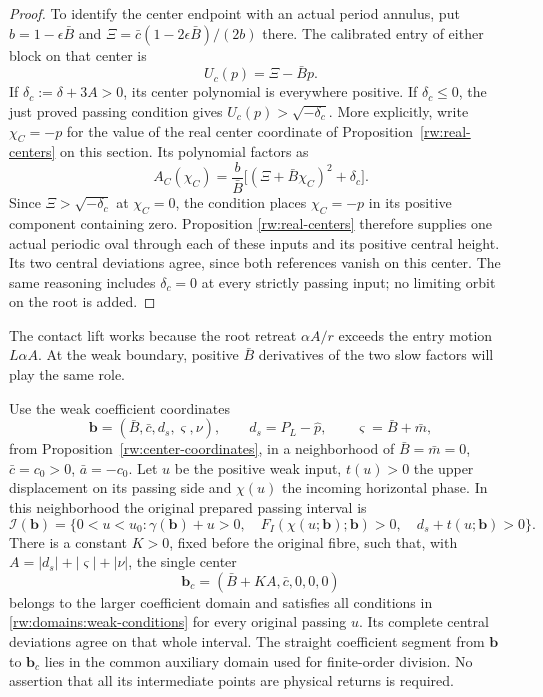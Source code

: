 \begin{proof}
To identify the center endpoint with an actual period annulus, put
$b=1-\epsilon\bar B$ and
$\Xi=\bar c(1-2\epsilon\bar B)/(2b)$ there. The calibrated
entry of either block on that center is
\[
 U_c(p)=\Xi-\bar Bp.
\]
If $\delta_c:=\delta+3A>0$, its center polynomial is everywhere
positive. If $\delta_c\le0$, the just proved passing condition
gives $U_c(p)>\sqrt{-\delta_c}$. More explicitly, write
$\chi_C=-p$ for the value of the real center coordinate of
Proposition~\ref{rw:real-centers} on this section. Its polynomial
factors as
\[
 A_C(\chi_C)=\frac b{\bar B}
              \bigl[(\Xi+\bar B\chi_C)^2+\delta_c\bigr].
\]
Since $\Xi>\sqrt{-\delta_c}$ at $\chi_C=0$, the condition places
$\chi_C=-p$ in its positive component containing zero. Proposition
\ref{rw:real-centers} therefore supplies one actual periodic oval
through each of these inputs and its positive central height.
Its two central deviations agree, since both references vanish on
this center. The same reasoning includes $\delta_c=0$ at every
strictly passing input; no limiting orbit on the root is added.
\end{proof}

The contact lift works because the root retreat $\alpha A/r$ exceeds
the entry motion $L\alpha A$. At the weak boundary, positive
$\bar B$ derivatives of the two slow factors will play the same role.

\begin{proposition}
\label{rw:domains:weak}
Use the weak coefficient coordinates
\[
 \mathbf b=(\bar B,\bar c,d_s,\varsigma,\nu),\qquad
 d_s=P_L-\widehat p,\qquad\varsigma=\bar B+\bar m,
\]
from Proposition~\ref{rw:center-coordinates}, in a neighborhood of
$\bar B=\bar m=0$, $\bar c=c_0>0$, $\bar a=-c_0$.
Let $u$ be the positive weak input, $t(u)>0$ the upper displacement
on its passing side and $\chi(u)$ the incoming horizontal phase.
In this neighborhood the original prepared passing interval is
\begin{equation}\label{rw:domains:weak-conditions}
 \mathcal I(\mathbf b)=\{0<u<u_0:
 \gamma(\mathbf b)+u>0,\quad
 F_I(\chi(u;\mathbf b);\mathbf b)>0,\quad
 d_s+t(u;\mathbf b)>0\}.
\end{equation}
There is a constant $K>0$, fixed before the original fibre, such
that, with $A=|d_s|+|\varsigma|+|\nu|$, the single center
\begin{equation}\label{rw:domains:weak-center}
 \mathbf b_c=(\bar B+KA,\bar c,0,0,0)
\end{equation}
belongs to the larger coefficient domain and satisfies all conditions
in \eqref{rw:domains:weak-conditions} for every original passing
$u$. Its complete central deviations agree on that whole interval.
The straight coefficient segment from $\mathbf b$ to $\mathbf b_c$
lies in the common auxiliary domain used for finite-order division.
No assertion that all its intermediate points are physical returns
is required.
\end{proposition}

